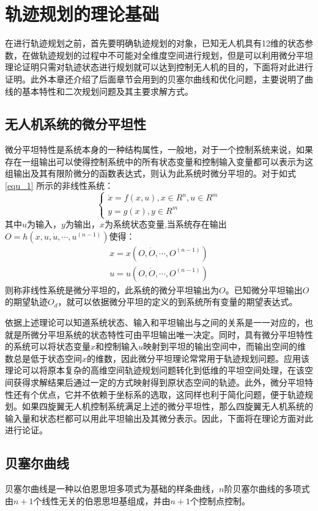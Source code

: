 \chapter{轨迹规划的理论基础}
在进行轨迹规划之前，首先要明确轨迹规划的对象，已知无人机具有12维的状态参数，在做轨迹规划的过程中不可能对全维度空间进行规划，但是可以利用微分平坦理论证明只需对轨迹状态进行规划就可以达到控制无人机的目的，下面将对此进行证明。此外本章还介绍了后面章节会用到的贝塞尔曲线和优化问题，主要说明了曲线的基本特性和二次规划问题及其主要求解方式。

\section{无人机系统的微分平坦性}
微分平坦特性是系统本身的一种结构属性，一般地，对于一个控制系统来说，如果存在一组输出可以使得控制系统中的所有状态变量和控制输入变量都可以表示为这组输出及其有限阶微分的函数表达式，则认为此系统时微分平坦的。对于如式 \ref{equ_1} 所示的非线性系统：
\setlength\abovedisplayskip{0.15cm}
\setlength\belowdisplayskip{0.15cm}%
\begin{equation}
    \left\{ \begin{array}{l}
    \dot x = f(x,u),x \in {R^n},u \in {R^m}\\
    y = g(x),y \in {R^m}
    \end{array} 
    \right.
    \label{equ_1}
\end{equation}
其中$u$为输入，$y$为输出，$x$为系统状态变量,当系统存在输出${O = h(x,u,\dot u, \cdots ,{u^{(n - 1)}})}$使得：
\begin{equation}
    \begin{array}{l}
        x = x(O,\dot O, \cdots ,{O^{(n - 1)}})\\
        u = u(O,\dot O, \cdots ,{O^{(n - 1)}})
        \end{array}
        \label{equ_2}
\end{equation}
则称非线性系统是微分平坦的，此系统的微分平坦输出为${O}$。已知微分平坦输出${O}$的期望轨迹${O_d}$，就可以依据微分平坦的定义的到系统所有变量的期望表达式。

依据上述理论可以知道系统状态、输入和平坦输出与之间的关系是一一对应的，也就是所微分平坦系统的状态特性可由平坦输出唯一决定。同时，具有微分平坦特性的系统可以将状态变量$x$和控制输入$u$映射到平坦的输出空间中，而输出空间的维数总是低于状态空间$x$的维数，因此微分平坦理论常常用于轨迹规划问题。应用该理论可以将原本复杂的高维空间轨迹规划问题转化到低维的平坦空间处理，在该空间获得求解结果后通过一定的方式映射得到原状态空间的轨迹。此外，微分平坦特性还有个优点，它并不依赖于坐标系的选取，这同样也利于简化问题，便于轨迹规划。如果四旋翼无人机控制系统满足上述的微分平坦性，那么四旋翼无人机系统的输入量和状态栏都可以用此平坦输出及其微分表示。因此，下面将在理论方面对此进行论证。


\section{贝塞尔曲线}

贝塞尔曲线是一种以伯恩思坦多项式为基础的样条曲线，$n$阶贝塞尔曲线的多项式由$n+1$个线性无关的伯恩思坦基组成，并由$n+1$个控制点控制。


\endinput